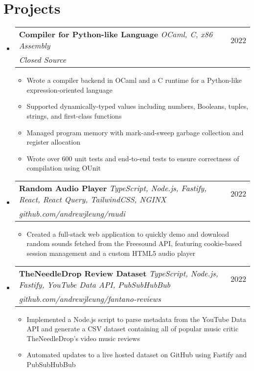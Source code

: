 \documentclass[letterpaper, 11pt]{article}
\makeatletter
\newcommand{\resumeItem}[1]{
  \item\small{
    {#1 \vspace{-2pt}}
  }
}
\newcommand{\resumeProjectHeading}[3]{
    \item
    \begin{tabular*}{0.97\textwidth}{l@{\extracolsep{\fill}}r}
      \small#1 & #2 \\
     \textit{\small{#3}}
    \end{tabular*}\vspace{-7pt}
}
\newcommand{\resumeSubHeadingListStart}{\begin{itemize}[leftmargin=0.15in, label={}]}
\newcommand{\resumeSubHeadingListEnd}{\end{itemize}}
\newcommand{\resumeItemListStart}{\begin{itemize}}
\newcommand{\resumeItemListEnd}{\end{itemize}\vspace{-5pt}}
\makeatother
\begin{document}
\section{Projects}
    \resumeSubHeadingListStart  
        \resumeProjectHeading
            {\textbf{Compiler for Python-like Language} \emph{OCaml, C, x86 Assembly}}{2022}{Closed Source}
            \resumeItemListStart
                \resumeItem{Wrote a compiler backend in OCaml and a C runtime for a Python-like expression-oriented language}
                \resumeItem{Supported dynamically-typed values including numbers, Booleans, tuples, strings, and first-class functions}
                \resumeItem{Managed program memory with mark-and-sweep garbage collection and register allocation}
                \resumeItem{Wrote over 600 unit tests and end-to-end tests to ensure correctness of compilation using OUnit}
            \resumeItemListEnd
        \resumeProjectHeading
            {\textbf{Random Audio Player} \emph{TypeScript, Node.js, Fastify, React, React Query, TailwindCSS, NGINX}}{2022}{github.com/andrewjleung/raudi}
            \resumeItemListStart
                \resumeItem{Created a full-stack web application to quickly demo and download random sounds fetched from the Freesound API, featuring cookie-based session management and a custom HTML5 audio player}
            \resumeItemListEnd
        \resumeProjectHeading
            {\textbf{TheNeedleDrop Review Dataset} \emph{TypeScript, Node.js, Fastify, YouTube Data API, PubSubHubBub}}{2022}{github.com/andrewjleung/fantano-reviews}
            \resumeItemListStart
                \resumeItem{Implemented a Node.js script to parse metadata from the YouTube Data API and generate a CSV dataset containing all of popular music critic TheNeedleDrop’s video music reviews}
                \resumeItem{Automated updates to a live hosted dataset on GitHub using Fastify and PubSubHubBub}
            \resumeItemListEnd
    \resumeSubHeadingListEnd
  
\end{document}
